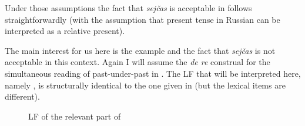 \documentclass[output=paper,modfonts,newtxmath,hidelinks]{langscibook}
\begin{document}
\noindent Under those assumptions the fact that \textit{sejčas} is acceptable in  follows straightforwardly (with the assumption that present tense in Russian can be interpreted as a relative present).\largerpage[2]

The main interest for us here is the example  and the fact that \textit{sejčas} is not acceptable in this context. Again I will assume the \textit{de re} construal for the simultaneous reading of past-under-past in . The LF that will be interpreted here, namely , is structurally identical to the one given in  (but the lexical items are different).

\begin{figure}
\caption{LF of the relevant part of }\label{20:ex46}
\end{figure}
\end{document}
